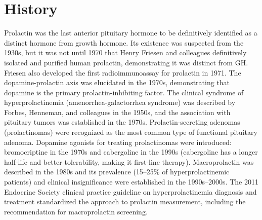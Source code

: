 \section*{History}
Prolactin was the last anterior pituitary hormone to be definitively identified as a distinct hormone from growth hormone. Its existence was suspected from the 1930s, but it was not until 1970 that Henry Friesen and colleagues definitively isolated and purified human prolactin, demonstrating it was distinct from GH. Friesen also developed the first radioimmunoassay for prolactin in 1971. The dopamine-prolactin axis was elucidated in the 1970s, demonstrating that dopamine is the primary prolactin-inhibiting factor. The clinical syndrome of hyperprolactinemia (amenorrhea-galactorrhea syndrome) was described by Forbes, Henneman, and colleagues in the 1950s, and the association with pituitary tumors was established in the 1970s. Prolactin-secreting adenomas (prolactinomas) were recognized as the most common type of functional pituitary adenoma. Dopamine agonists for treating prolactinomas were introduced: bromocriptine in the 1970s and cabergoline in the 1990s (cabergoline has a longer half-life and better tolerability, making it first-line therapy). Macroprolactin was described in the 1980s and its prevalence (15--25\% of hyperprolactinemic patients) and clinical insignificance were established in the 1990s--2000s. The 2011 Endocrine Society clinical practice guideline on hyperprolactinemia diagnosis and treatment standardized the approach to prolactin measurement, including the recommendation for macroprolactin screening.

